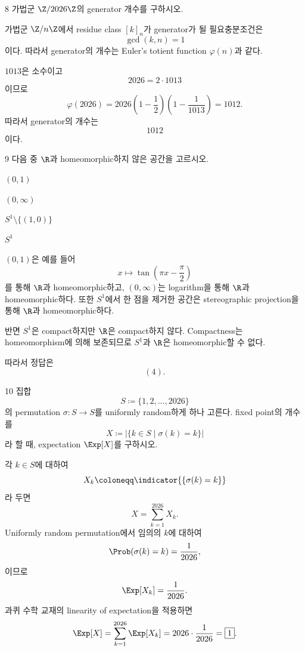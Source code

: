 \begin{problem}{8}
가법군 $\Z/2026\Z$의 generator 개수를 구하시오.
\end{problem}

\begin{solution}
가법군 $\Z/n\Z$에서 residue class $[k]_n$가 generator가 될 필요충분조건은
\[
    \gcd(k,n)=1
\]
이다. 따라서 generator의 개수는 Euler's totient function $\varphi(n)$과 같다.

$1013$은 소수이고
\[
    2026=2\cdot1013
\]
이므로
\[
    \varphi(2026)
    =
    2026\left(1-\frac12\right)
    \left(1-\frac{1}{1013}\right)
    =1012.
\]
따라서 generator의 개수는
\[
    \boxed{1012}
\]
이다.
\end{solution}

\begin{problem}{9}
다음 중 $\R$과 homeomorphic하지 않은 공간을 고르시오.

\begin{problemchoices}
    \item $(0,1)$
    \item $(0,\infty)$
    \item $S^1\setminus\{(1,0)\}$
    \item $S^1$
\end{problemchoices}
\end{problem}

\begin{solution}
$(0,1)$은 예를 들어
\[
    x\mapsto\tan\left(\pi x-\frac{\pi}{2}\right)
\]
를 통해 $\R$과 homeomorphic하고, $(0,\infty)$는 logarithm을 통해 $\R$과 homeomorphic하다. 또한 $S^1$에서 한 점을 제거한 공간은 stereographic projection을 통해 $\R$과 homeomorphic하다.

반면 $S^1$은 compact하지만 $\R$은 compact하지 않다. Compactness는 homeomorphism에 의해 보존되므로 $S^1$과 $\R$은 homeomorphic할 수 없다.

따라서 정답은
\[
    \boxed{(4)}.
\]
\end{solution}

\begin{problem}{10}
집합
\[
    S\coloneqq \{1,2,\ldots,2026\}
\]
의 permutation $\sigma\colon S\to S$를 uniformly random하게 하나 고른다. fixed point의 개수를
\[
    X
    \coloneqq
    \left|\{k\in S\mid \sigma(k)=k\}\right|
\]
라 할 때, expectation $\Exp[X]$를 구하시오.
\end{problem}

\begin{solution}
각 $k\in S$에 대하여
\[
    X_k
    \coloneqq
    \indicator{\{\sigma(k)=k\}}
\]
라 두면
\[
    X=\sum_{k=1}^{2026}X_k.
\]
Uniformly random permutation에서 임의의 $k$에 대하여
\[
    \Prob(\sigma(k)=k)=\frac{1}{2026},
\]
이므로
\[
    \Exp[X_k]=\frac{1}{2026}.
\]
과퀴 수학 교재의 linearity of expectation을 적용하면
\[
    \Exp[X]
    =
    \sum_{k=1}^{2026}\Exp[X_k]
    =
    2026\cdot\frac{1}{2026}
    =
    \boxed{1}.
\]
\end{solution}
